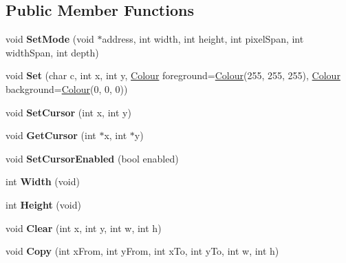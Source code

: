\subsection*{Public Member Functions}
\begin{DoxyCompactItemize}
\item 
\mbox{\label{class_graphical_console_driver_a2e54aac1329dfd54696fcf5104810259}} 
void {\bfseries Set\+Mode} (void $\ast$address, int width, int height, int pixel\+Span, int width\+Span, int depth)
\item 
\mbox{\label{class_graphical_console_driver_a63cc9dea01f6dd077c571500d9e19fea}} 
void {\bfseries Set} (char c, int x, int y, \hyperlink{class_console_driver_1_1_colour}{Colour} foreground=\hyperlink{class_console_driver_1_1_colour}{Colour}(255, 255, 255), \hyperlink{class_console_driver_1_1_colour}{Colour} background=\hyperlink{class_console_driver_1_1_colour}{Colour}(0, 0, 0))
\item 
\mbox{\label{class_graphical_console_driver_afdfcf91a3df641a246d443f4f1437cf4}} 
void {\bfseries Set\+Cursor} (int x, int y)
\item 
\mbox{\label{class_graphical_console_driver_a49a19d5567c5370a995f9b021144d852}} 
void {\bfseries Get\+Cursor} (int $\ast$x, int $\ast$y)
\item 
\mbox{\label{class_graphical_console_driver_a1c8cae5032b8567e64ba158544c751b5}} 
void {\bfseries Set\+Cursor\+Enabled} (bool enabled)
\item 
\mbox{\label{class_graphical_console_driver_aa97a0ad0854e310207fc993b605224d8}} 
int {\bfseries Width} (void)
\item 
\mbox{\label{class_graphical_console_driver_a4442ccf1cdf30f4d16468ccd621298e5}} 
int {\bfseries Height} (void)
\item 
\mbox{\label{class_graphical_console_driver_ac0f4c19da01bae81d3a54290cedbe5ce}} 
void {\bfseries Clear} (int x, int y, int w, int h)
\item 
\mbox{\label{class_graphical_console_driver_ae993d049898931292ded38d33f64354d}} 
void {\bfseries Copy} (int x\+From, int y\+From, int x\+To, int y\+To, int w, int h)
\end{DoxyCompactItemize}
